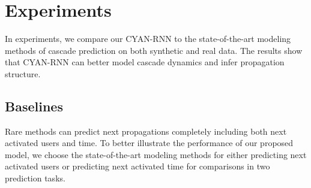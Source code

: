 \section{Experiments}
\label{sec:exp}
In experiments, we compare our CYAN-RNN 
to the state-of-the-art modeling methods of cascade prediction on both
synthetic and real data. 
The results show that CYAN-RNN can better model cascade dynamics
and infer propagation structure.

\subsection{Baselines}

Rare methods can predict next propagations completely including both next
activated users and time. To better illustrate the performance of our
proposed model, we choose the state-of-the-art modeling methods for either
predicting next activated users or predicting next activated time for comparisons in two
prediction tasks.

